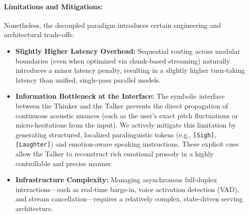 \paragraph{Limitations and Mitigations:}
Nonetheless, the decoupled paradigm introduces certain engineering and architectural trade-offs:
\begin{itemize}
    \item \textbf{Slightly Higher Latency Overhead:} Sequential routing across modular boundaries (even when optimized via chunk-based streaming) naturally introduces a minor latency penalty, resulting in a slightly higher turn-taking latency than unified, single-pass parallel models.
    
    \item \textbf{Information Bottleneck at the Interface:} The symbolic interface between the Thinker and the Talker prevents the direct propagation of continuous acoustic nuances (such as the user's exact pitch fluctuations or micro-hesitations from the input). We actively mitigate this limitation by generating structured, localized paralinguistic tokens (e.g., \texttt{[Sigh]}, \texttt{[Laughter]}) and emotion-aware speaking instructions. These explicit cues allow the Talker to reconstruct rich emotional prosody in a highly controllable and precise manner.
    
    \item \textbf{Infrastructure Complexity:} Managing asynchronous full-duplex interactions—such as real-time barge-in, voice activation detection (VAD), and stream cancellation—requires a relatively complex, state-driven serving architecture.
\end{itemize}







